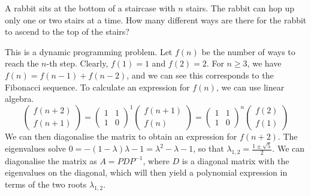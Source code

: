 \begin{qanda} %
  \Q
  A rabbit sits at the bottom of a staircase with $n$ stairs.
  The rabbit can hop up only one or two stairs at a time. How many different ways are there for the rabbit to ascend to the top of the stairs?

  \A
  This is a dynamic programming problem.
  Let $f(n)$ be the number of ways to reach the $n$-th step.
  Clearly, $f(1)=1$ and $f(2) = 2$.
  For $n \geq 3$, we have $f(n) = f(n-1) + f(n-2)$, and we can see this corresponds to the Fibonacci sequence. 
  To calculate an expression for $f(n)$, we can use linear algebra.
  \[
  \begin{pmatrix} f(n+2) \\ f(n+1) \end{pmatrix} 
  = 
  \begin{pmatrix}
    1 & 1  \\
    1 & 0 
  \end{pmatrix}^1
  \begin{pmatrix} f(n+1) \\ f(n) \end{pmatrix}  =
  \begin{pmatrix}
    1 & 1  \\
    1 & 0 
\end{pmatrix}^{n}
  \begin{pmatrix} f(2) \\ f(1) \end{pmatrix} 
  \]
  We can then diagonalise the matrix to obtain an expression for $f(n+2)$.
  The eigenvalues solve $0=-(1-\lambda)\lambda - 1 = \lambda^2 - \lambda - 1$, so that $\lambda_{1,2} = \frac{1 \pm \sqrt{5}}{2}$.
  We can diagonalise the matrix as $A = P D P^{-1}$, where $D$ is a diagonal matrix with the eigenvalues on the diagonal, which will then yield a polynomial expression in terms of the two roots $\lambda_{1,2}$.
\end{qanda}

